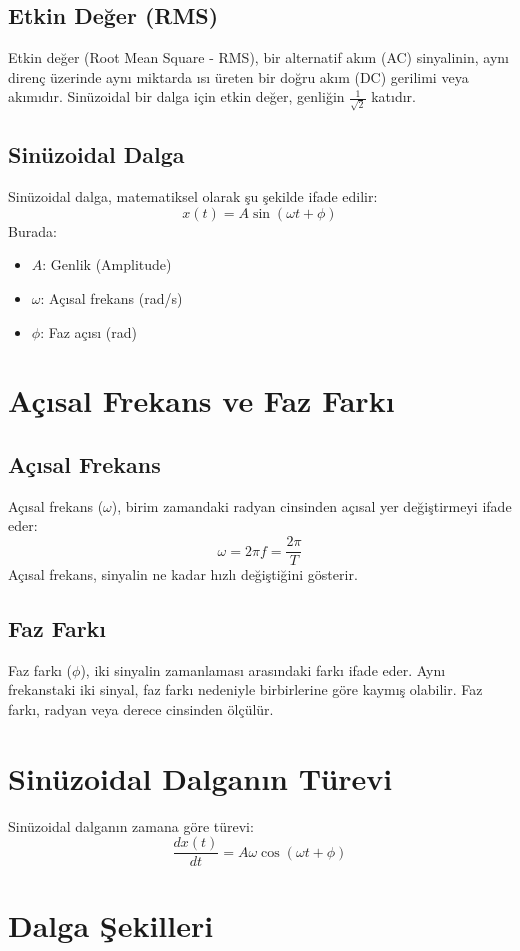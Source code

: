 \documentclass[11pt,letterpaper]{fenbil}
\begin{document}
\begin{spacing}{1.2}
\subsection*{Etkin Değer (RMS)}
Etkin değer (Root Mean Square - RMS), bir alternatif akım (AC) sinyalinin, aynı direnç üzerinde aynı miktarda ısı üreten bir doğru akım (DC) gerilimi veya akımıdır. Sinüzoidal bir dalga için etkin değer, genliğin $\frac{1}{\sqrt{2}}$ katıdır.

\subsection*{Sinüzoidal Dalga}
Sinüzoidal dalga, matematiksel olarak şu şekilde ifade edilir:
\[
x(t) = A \sin(\omega t + \phi)
\]
Burada:
\begin{itemize}
\item $A$: Genlik (Amplitude)
\item $\omega$: Açısal frekans (rad/s)
\item $\phi$: Faz açısı (rad)
\end{itemize}

\section*{Açısal Frekans ve Faz Farkı}
\subsection*{Açısal Frekans}
Açısal frekans ($\omega$), birim zamandaki radyan cinsinden açısal yer değiştirmeyi ifade eder:
\[
\omega = 2\pi f = \frac{2\pi}{T}
\]
Açısal frekans, sinyalin ne kadar hızlı değiştiğini gösterir.

\subsection*{Faz Farkı}
Faz farkı ($\phi$), iki sinyalin zamanlaması arasındaki farkı ifade eder. Aynı frekanstaki iki sinyal, faz farkı nedeniyle birbirlerine göre kaymış olabilir. Faz farkı, radyan veya derece cinsinden ölçülür.

\section*{Sinüzoidal Dalganın Türevi}
Sinüzoidal dalganın zamana göre türevi:
\[
\frac{dx(t)}{dt} = A\omega \cos(\omega t + \phi)
\]

\section*{Dalga Şekilleri}

\end{spacing}
\end{document}
